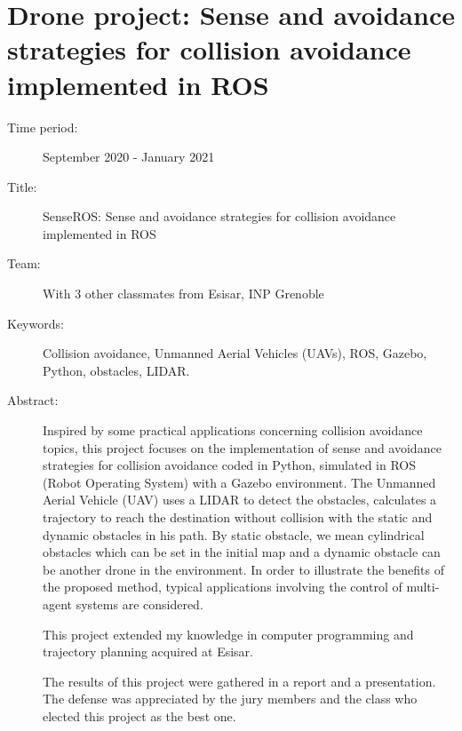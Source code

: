 \documentclass[a4paper,10pt]{article}
\begin{document}
\section{Drone project: Sense and avoidance strategies for collision avoidance implemented in ROS}
\begin{description}
    \item[Time period:] September 2020 - January 2021
    \item[Title:] SenseROS: Sense and avoidance strategies for collision
          avoidance implemented in ROS
    \item[Team:] With 3 other classmates from Esisar, INP Grenoble
    \item[Keywords:] Collision avoidance, Unmanned Aerial Vehicles (UAVs), ROS, Gazebo, Python, obstacles, LIDAR.
    \item[Abstract:] Inspired by some practical applications concerning collision avoidance topics, this project focuses on the
          implementation of sense and avoidance strategies for collision avoidance coded in Python, simulated in ROS (Robot Operating System) with a Gazebo environment. The Unmanned Aerial Vehicle (UAV) uses a LIDAR to detect the obstacles, calculates a trajectory to reach the destination without collision with the static and dynamic obstacles in his path. By static obstacle, we mean cylindrical obstacles which can be set in the initial map and a dynamic obstacle can be another drone in the environment. In order to illustrate the benefits of the proposed method, typical applications involving the control of multi-agent systems are considered.

          This project extended my knowledge in computer programming and trajectory planning acquired at Esisar.

          The results of this project were gathered in a report and a presentation. The defense was appreciated by the jury members and the class who elected this project as the best one.
\end{description}
\end{document}
